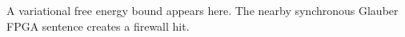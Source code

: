 A variational free energy bound appears here.
The nearby synchronous Glauber FPGA sentence creates a firewall hit.

